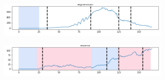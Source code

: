 \documentclass{article}
\begin{document}







\begin{figure}[ht!]
\centering
\begin{subfigure}{\textwidth}
    	\centering
        \includegraphics[width=0.9\textwidth]{_Afghanistan.png}
    \end{subfigure}
    \begin{subfigure}{\textwidth}
    	\centering
        \includegraphics[width=0.9\textwidth]{_Albania.png}
    \end{subfigure}
   

\end{figure}
\end{document}
